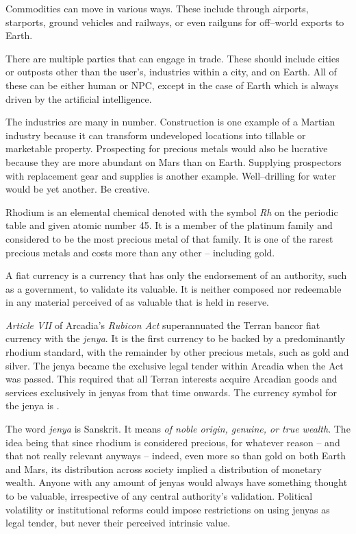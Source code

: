 Commodities can move in various ways. These include through airports, starports, ground vehicles and railways, or even railguns for off--world exports to Earth.

There are multiple parties that can engage in trade. These should include cities or outposts other than the user's, industries within a city, and on Earth. All of these can be either human or NPC, except in the case of Earth which is always driven by the artificial intelligence.

The industries are many in number. Construction is one example of a Martian industry because it can transform undeveloped locations into tillable or marketable property. Prospecting for precious metals would also be lucrative because they are more abundant on Mars than on Earth. Supplying prospectors with replacement gear and supplies is another example. Well--drilling for water would be yet another. Be creative.

Rhodium is an elemental chemical denoted with the symbol {\it Rh} on the periodic table and given atomic number 45. It is a member of the platinum family and considered to be the most precious metal of that family. It is one of the rarest precious metals and costs more than any other -- including gold.

A fiat currency is a currency that has only the endorsement of an authority, such as a government, to validate its valuable. It is neither composed nor redeemable in any material perceived of as valuable that is held in reserve.

{\it Article VII} of Arcadia's {\it Rubicon Act} superannuated the Terran bancor fiat currency with the {\it jenya}. It is the first currency to be backed by a predominantly rhodium standard, with the remainder by other precious metals, such as gold and silver. The jenya became the exclusive legal tender within Arcadia when the Act was passed. This required that all Terran interests acquire Arcadian goods and services exclusively in jenyas from that time onwards. The currency symbol for the jenya is .

    {}

The word {\it jenya} is Sanskrit. It means {\it of noble origin, genuine, or true wealth}. The idea being that since rhodium is considered precious, for whatever reason -- and that not really relevant anyways -- indeed, even more so than gold on both Earth and Mars, its distribution across society implied a distribution of monetary wealth. Anyone with any amount of jenyas would always have something thought to be valuable, irrespective of any central authority's validation. Political volatility or institutional reforms could impose restrictions on using jenyas as legal tender, but never their perceived intrinsic value.

